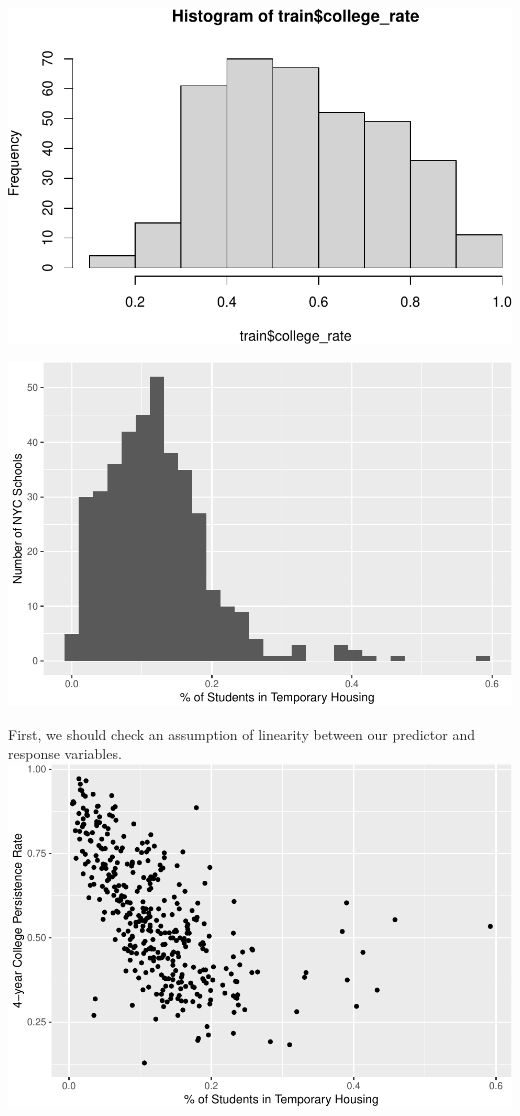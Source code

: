 \documentclass[
  man]{apa6}
\begin{document}
\includegraphics{final-project_files/figure-latex/unnamed-chunk-5-1.pdf}

\includegraphics{final-project_files/figure-latex/unnamed-chunk-6-1.pdf}

First, we should check an assumption of linearity between our predictor and response variables.
\includegraphics{final-project_files/figure-latex/unnamed-chunk-7-1.pdf}
\end{document}
